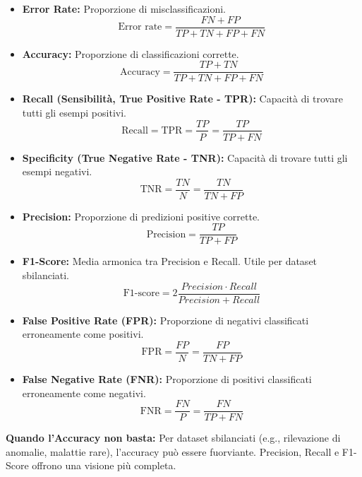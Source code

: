 \documentclass[a4paper,11pt]{article}
\begin{document}
\begin{itemize}
    \item \textbf{Error Rate:} Proporzione di misclassificazioni.
    \begin{equation}
        \text{Error rate} = \frac{FN + FP}{TP + TN + FP + FN}
    \end{equation}
    \item \textbf{Accuracy:} Proporzione di classificazioni corrette.
    \begin{equation}
        \text{Accuracy} = \frac{TP + TN}{TP + TN + FP + FN}
    \end{equation}
    \item \textbf{Recall (Sensibilità, True Positive Rate - TPR):} Capacità di trovare tutti gli esempi positivi.
    \begin{equation}
        \text{Recall} = \text{TPR} = \frac{TP}{P} = \frac{TP}{TP + FN}
    \end{equation}
    \item \textbf{Specificity (True Negative Rate - TNR):} Capacità di trovare tutti gli esempi negativi.
    \begin{equation}
        \text{TNR} = \frac{TN}{N} = \frac{TN}{TN + FP}
    \end{equation}
    \item \textbf{Precision:} Proporzione di predizioni positive corrette.
    \begin{equation}
        \text{Precision} = \frac{TP}{TP + FP}
    \end{equation}
    \item \textbf{F1-Score:} Media armonica tra Precision e Recall. Utile per dataset sbilanciati.
    \begin{equation}
        \text{F1-score} = 2 \frac{Precision \cdot Recall}{Precision + Recall}
    \end{equation}
    \item \textbf{False Positive Rate (FPR):} Proporzione di negativi classificati erroneamente come positivi.
    \begin{equation}
        \text{FPR} = \frac{FP}{N} = \frac{FP}{TN + FP}
    \end{equation}
    \item \textbf{False Negative Rate (FNR):} Proporzione di positivi classificati erroneamente come negativi.
    \begin{equation}
        \text{FNR} = \frac{FN}{P} = \frac{FN}{TP + FN}
    \end{equation}
\end{itemize}
\textbf{Quando l'Accuracy non basta:} Per dataset sbilanciati (e.g., rilevazione di anomalie, malattie rare), l'accuracy può essere fuorviante. Precision, Recall e F1-Score offrono una visione più completa.
\end{document}
